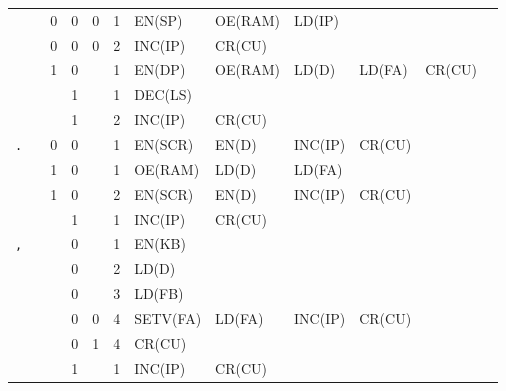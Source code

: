\begin{longtable}[c] {c|cccc|c|llllll}
    \rowcolor{Gray}               &   & 0 & 0     & 0    & 1     & EN(SP)   & OE(RAM)  & LD(IP)  &        &        &        \\
    \rowcolor{Gray}               &   & 0 & 0     & 0    & 2     & INC(IP)  & CR(CU)   &         &        &        &        \\
    \rowcolor{White}              &   & 1 & 0     &      & 1     & EN(DP)   & OE(RAM)  & LD(D)   & LD(FA) & CR(CU) &        \\
    \rowcolor{Gray}               &   &   & 1     &      & 1     & DEC(LS)  &          &         &        &        &        \\ 
    \rowcolor{Gray}               &   &   & 1     &      & 2     & INC(IP)  & CR(CU)   &         &        &        &        \\ \hline
    
    \rowcolor{Gray}  \texttt{.}   &   & 0 & 0     &      & 1     & EN(SCR)  & EN(D)    & INC(IP) & CR(CU) &        &        \\
    \rowcolor{White}              &   & 1 & 0     &      & 1     & OE(RAM)  & LD(D)    & LD(FA)  &        &        &        \\
    \rowcolor{White}              &   & 1 & 0     &      & 2     & EN(SCR)  & EN(D)    & INC(IP) & CR(CU) &        &        \\
    \rowcolor{Gray}               &   &   & 1     &      & 1     & INC(IP)  & CR(CU)   &         &        &        &        \\ \hline
    
    \rowcolor{White} \texttt{,}   &   &   & 0     &      & 1     & EN(KB)   &          &         &        &        &        \\
    \rowcolor{White}              &   &   & 0     &      & 2     & LD(D)    &          &         &        &        &        \\
    \rowcolor{White}              &   &   & 0     &      & 3     & LD(FB)   &          &         &        &        &        \\    
    \rowcolor{White}              &   &   & 0     & 0    & 4     & SETV(FA) & LD(FA)   & INC(IP) & CR(CU) &        &        \\
    \rowcolor{Gray}               &   &   & 0     & 1    & 4     & CR(CU)   &          &         &        &        &        \\   
    \rowcolor{White}              &   &   & 1     &      & 1     & INC(IP)  & CR(CU)   &         &        &        &        \\ \hline
    

\end{longtable}
